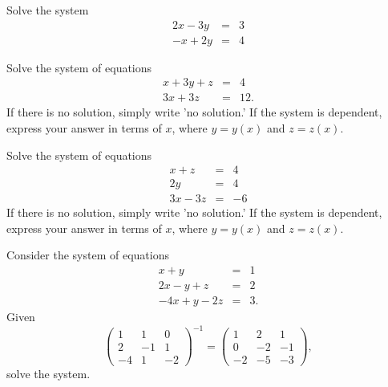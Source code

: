 \documentclass[12pt]{amsart}
\begin{document}
\newpage

\begin{thm}[20 Points]\label{ex2}
  Solve the system
  \begin{eqnarray*}
    2x -3y &=& 3\\
    -x + 2y &=& 4
  \end{eqnarray*}
\end{thm}

\newpage

\begin{thm}[20 Points]\label{ex3}
  Solve the system of equations
  \begin{eqnarray*}
    x + 3y + z &=& 4\\
    3x + 3z &=& 12.
  \end{eqnarray*}
  If there is no solution, simply write 'no solution.'  If the system is dependent, express your answer in terms of $x$, where $y = y(x)$ and $z = z(x)$.
\end{thm}

\newpage

\begin{thm}[20 Points]\label{ex4}
  Solve the system of equations
  \begin{eqnarray*}
    x + z &=& 4\\
    2y    &=& 4\\
    3x - 3z &=& -6
  \end{eqnarray*}
  If there is no solution, simply write 'no solution.'  If the system is dependent, express your answer in terms of $x$, where $y = y(x)$ and $z = z(x)$.
\end{thm}


\newpage

\begin{thm}[20 Points]\label{ex5}
  Consider the system of equations
  \begin{eqnarray*}
    x + y &=& 1\\
    2x - y + z &=& 2\\
    -4x + y - 2z &=& 3.
  \end{eqnarray*}
  Given  
  $$\left(\begin{array}{ccc}
    1 & 1 & 0\\
    2 & -1 & 1\\
    -4 & 1 & -2
  \end{array}\right)^{-1} = \left(\begin{array}{ccc}
    1 & 2 & 1\\
    0 & -2 & -1\\
    -2 & -5 & -3
  \end{array}\right),$$
  solve the system.
\end{thm}


\end{document}

